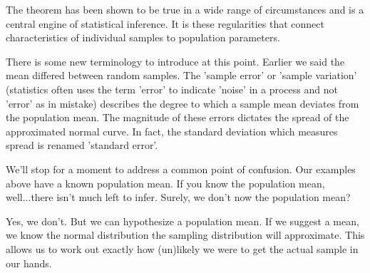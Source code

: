 \documentclass{article}
\begin{document}
The theorem has been shown to be true in a wide range of circumstances and is a central engine of statistical inference. It is these regularities that connect characteristics of individual samples to population parameters.

There is some new terminology to introduce at this point. Earlier we said the mean differed between random samples. The 'sample error' or 'sample variation' (statistics often uses the term 'error' to indicate 'noise' in a process and not 'error' as in mistake) describes the degree to which a sample mean deviates from the population mean. The magnitude of these errors dictates the spread of the approximated normal curve. In fact, the standard deviation which measures spread is renamed 'standard error'.

We'll stop for a moment to address a common point of confusion. Our examples above have a known population mean. If you know the population mean, well...there isn't much left to infer. Surely, we don't now the population mean?

Yes, we don't. But we can hypothesize a population mean. If we suggest a mean, we know the normal distribution the sampling distribution will approximate. This allows us to work out exactly how (un)likely we were to get the actual sample in our hands. 
\end{document}
